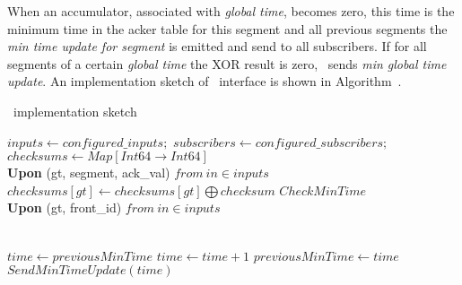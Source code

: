When an accumulator, associated with \textit{global time}, becomes zero, this time is the minimum time in the acker table for this segment and all previous segments the \textit{min time update for segment} is emitted and send to all subscribers. If for all segments of a certain \textit{global time} the XOR result is zero, \tracker\ sends \textit{min global time update}. An implementation sketch of \tracker\ interface is shown in Algorithm~\cite{tracker_algo}.

\begin{algorithm}
\caption{\tracker\ implementation sketch}
\label{tracker_algo}
\begin{algorithmic}[1]
\State $inputs \leftarrow configured\_inputs;$ 
\State $subscribers \leftarrow configured\_subscribers;$
\State $checksums \leftarrow Map[Int64 \rightarrow Int64]$
\\
\State \textbf{Upon} (gt, segment, ack\_val) $from \ in\in inputs$
\Indent
    \State $checksums[gt] \gets checksums[gt] \bigoplus checksum$
    \State $CheckMinTime$
\EndIndent
\\
\State \textbf{Upon} (gt, front\_id) $from \ in\in inputs$
\Indent
    
\EndIndent
\\
\State $time \gets previousMinTime$
\State $time \gets time + 1$
\EndWhile
{}
\State $previousMinTime \gets time$
\State $SendMinTimeUpdate(time)$
\EndIf
\EndProcedure
\end{algorithmic}
\end{algorithm}





